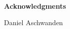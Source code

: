 

\clearpage
\begin{center}
 \textbf{Acknowledgments}
\end{center}



\vspace{2cm}
Daniel Aschwanden
\vfil

